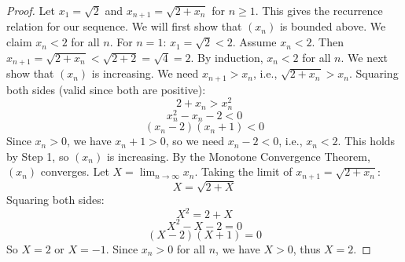 \documentclass[12pt]{article}
\begin{document}
\begin{proof}
Let $x_1 = \sqrt{2}$ and $x_{n+1} = \sqrt{2 + x_n}$ for $n \geq 1$. This gives the recurrence relation for our sequence.
\newline \newline
We will first show that $(x_n)$ is bounded above. We claim $x_n < 2$ for all $n$. 
\newline \newline
For $n = 1$: $x_1 = \sqrt{2} < 2$. 
\newline \newline
Assume $x_n < 2$. Then $x_{n+1} = \sqrt{2 + x_n} < \sqrt{2 + 2} = \sqrt{4} = 2$. By induction, $x_n < 2$ for all $n$.
We next show that $(x_n)$ is increasing. We need $x_{n+1} > x_n$, i.e., $\sqrt{2 + x_n} > x_n$.
\newline \newline
Squaring both sides (valid since both are positive):
$$2 + x_n > x_n^2$$
$$x_n^2 - x_n - 2 < 0$$
$$(x_n - 2)(x_n + 1) < 0$$
Since $x_n > 0$, we have $x_n + 1 > 0$, so we need $x_n - 2 < 0$, i.e., $x_n < 2$. This holds by Step 1, so $(x_n)$ is increasing.
\newline \newline
By the Monotone Convergence Theorem, $(x_n)$ converges. Let $X = \lim_{n\to\infty} x_n$.
Taking the limit of $x_{n+1} = \sqrt{2 + x_n}$:
$$X = \sqrt{2 + X}$$
Squaring both sides:
$$X^2 = 2 + X$$
$$X^2 - X - 2 = 0$$
$$(X-2)(X+1) = 0$$
So $X = 2$ or $X = -1$. Since $x_n > 0$ for all $n$, we have $X > 0$, thus $X = 2$.
\end{proof}
\end{document}
